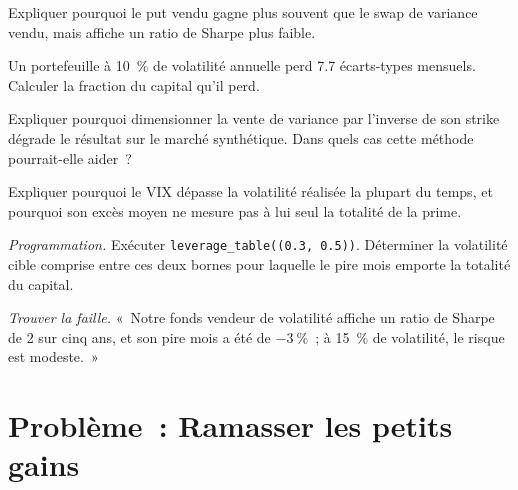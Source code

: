 \begin{exercise}[$\star$]\label{exo:s2:harvesting-the-variance-risk-premium:3}
Expliquer pourquoi le put vendu gagne plus souvent que le swap de variance vendu, mais affiche un ratio de Sharpe plus faible.
\end{exercise}

\begin{exercise}[$\star\star$]\label{exo:s2:harvesting-the-variance-risk-premium:4}
Un portefeuille à 10~\% de volatilité annuelle perd 7.7 écarts-types mensuels. Calculer la fraction du capital qu'il perd.
\end{exercise}

\begin{exercise}[$\star\star$]\label{exo:s2:harvesting-the-variance-risk-premium:5}
Expliquer pourquoi dimensionner la vente de variance par l'inverse de son strike dégrade le résultat sur le marché synthétique. Dans quels cas cette méthode pourrait-elle aider~?
\end{exercise}

\begin{exercise}[$\star\star$]\label{exo:s2:harvesting-the-variance-risk-premium:6}
Expliquer pourquoi le VIX dépasse la volatilité réalisée la plupart du temps, et pourquoi son excès moyen ne mesure pas à lui seul la totalité de la prime.
\end{exercise}

\begin{exercise}[$\star\star\star$]\label{exo:s2:harvesting-the-variance-risk-premium:7}
\emph{Programmation.} Exécuter \texttt{leverage\_table((0.3, 0.5))}. Déterminer la volatilité cible comprise entre ces deux bornes pour laquelle le pire mois emporte la totalité du capital.
\end{exercise}

\begin{exercise}[$\star\star\star$]\label{exo:s2:harvesting-the-variance-risk-premium:8}
\emph{Trouver la faille.} «~Notre fonds vendeur de volatilité affiche un ratio de Sharpe de 2 sur cinq ans, et son pire mois a été de $-3~\%$~; à 15~\% de volatilité, le risque
est modeste.~»
\end{exercise}

\section{Problème~: Ramasser les petits gains}

